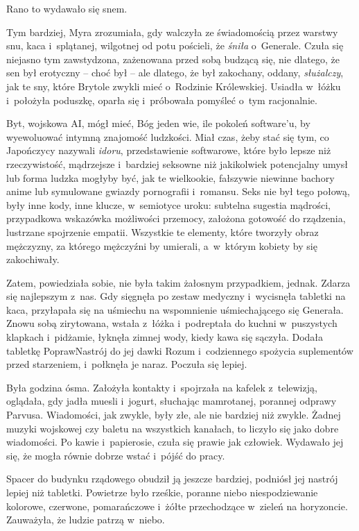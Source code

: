 \documentclass[oneside,polish,11pt,sfheadings]{mwbk}
\begin{document}
Rano to wydawało się snem.

Tym bardziej, Myra zrozumiała, gdy walczyła ze świadomością przez
warstwy snu, kaca i~splątanej, wilgotnej od potu pościeli, że
\textit{śniła} o~Generale. Czuła się niejasno tym zawstydzona, zażenowana
przed sobą budzącą się, nie dlatego, że sen był erotyczny -- choć był -- ale dlatego, że był zakochany, oddany, \textit{służalczy}, jak te sny,
które Brytole zwykli mieć o~Rodzinie Królewskiej. Usiadła w~łóżku i~położyła poduszkę, oparła się i~próbowała pomyśleć o~tym racjonalnie.

Byt, wojskowa AI, mógł mieć, Bóg jeden wie, ile pokoleń software'u, by
wyewoluować intymną znajomość ludzkości. Miał czas, żeby stać się tym,
co Japończycy nazywali \textit{idoru}, przedstawienie softwarowe, które
było lepsze niż rzeczywistość, mądrzejsze i~bardziej seksowne niż
jakikolwiek potencjalny umysł lub forma ludzka mogłyby być, jak te
wielkookie, fałszywie niewinne bachory anime lub symulowane gwiazdy
pornografii i~romansu. Seks nie był tego połową, były inne kody, inne
klucze, w~semiotyce uroku: subtelna sugestia mądrości, przypadkowa
wskazówka możliwości przemocy, założona gotowość do rządzenia, lustrzane
spojrzenie empatii. Wszystkie te elementy, które tworzyły obraz
mężczyzny, za którego mężczyźni by umierali, a~w~którym kobiety by się
zakochiwały.

Zatem, powiedziała sobie, nie była takim żałosnym przypadkiem, jednak.
Zdarza się najlepszym z~nas. Gdy sięgnęła po zestaw medyczny i~wycisnęła
tabletki na kaca, przyłapała się na uśmiechu na wspomnienie
uśmiechającego się Generała. Znowu sobą zirytowana, wstała z~łóżka i~podreptała do kuchni w~puszystych klapkach i~pidżamie, łyknęła zimnej
wody, kiedy kawa się sączyła. Dodała tabletkę PoprawNastrój do jej dawki
Rozum i~codziennego spożycia suplementów przed starzeniem, i~połknęła je
naraz. Poczuła się lepiej.

Była godzina ósma. Założyła kontakty i~spojrzała na kafelek z~telewizją,
oglądała, gdy jadła muesli i~jogurt, słuchając mamrotanej, porannej
odprawy Parvusa. Wiadomości, jak zwykle, były złe, ale nie bardziej niż
zwykle. Żadnej muzyki wojskowej czy baletu na wszystkich kanałach, to
liczyło się jako dobre wiadomości. Po kawie i~papierosie, czuła się
prawie jak człowiek. Wydawało jej się, że mogła równie dobrze wstać i~pójść do pracy.

Spacer do budynku rządowego obudził ją jeszcze bardziej, podniósł jej
nastrój lepiej niż tabletki. Powietrze było rześkie, poranne niebo
niespodziewanie kolorowe, czerwone, pomarańczowe i~żółte przechodzące w~zieleń na horyzoncie. Zauważyła, że ludzie patrzą w~niebo.
\end{document}
